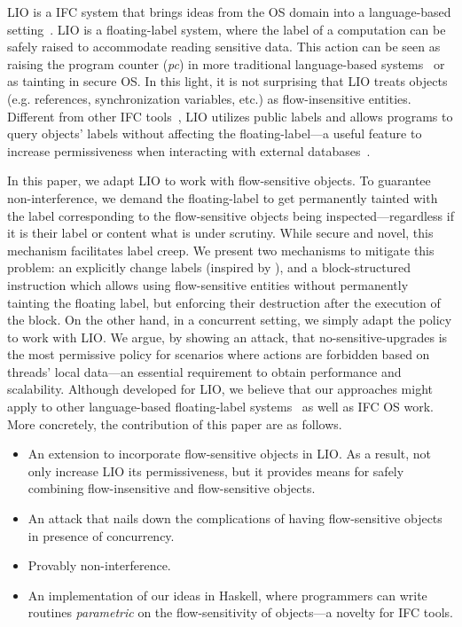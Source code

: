 LIO is a IFC system that brings ideas from the OS domain into a language-based
setting~\citep{stefan:lio,stefan:addressing-covert}.  LIO is a floating-label
system, where the label of a computation can be safely raised to accommodate
reading sensitive data. This action can be seen as raising the program counter
(\emph{pc}) in more traditional language-based
systems~\citep{sabelfeld:language-based-iflow} or as tainting in secure OS.  In
this light, it is not surprising that LIO treats objects (e.g. references,
synchronization variables, etc.) as flow-insensitive entities. Different from
other IFC tools~\citep{jif,FlowCaml,Hedin13}, LIO utilizes public labels and
allows programs to query objects' labels without affecting the
floating-label---a useful feature to increase permissiveness when interacting
with external databases~\citep{giffin:hails}.

In this paper, we adapt LIO to work with flow-sensitive objects. To guarantee
non-interference, we demand the floating-label to get permanently tainted with
the label corresponding to the flow-sensitive objects being
inspected---regardless if it is their label or content what is under
scrutiny. While secure and novel, this mechanism facilitates label creep. We
present two mechanisms to mitigate this problem: an explicitly change labels
(inspired by \citep{Hedin13}), and a block-structured instruction which allows
using flow-sensitive entities without permanently tainting the floating label,
but enforcing their destruction after the execution of the block.  On the other
hand, in a concurrent setting, we simply adapt the {\nsu} policy to work with
LIO. We argue, by showing an attack, that no-sensitive-upgrades is the most
permissive policy for scenarios where actions are forbidden based on threads'
local data---an essential requirement to obtain performance and
scalability. Although developed for LIO, we believe that our approaches might
apply to other language-based floating-label
systems~\citep[e.g.][]{10.1109/SP.2013.10} as well as IFC OS work.  More
concretely, the contribution of this paper are as follows.
\begin{itemize}

\item An extension to incorporate flow-sensitive objects in LIO. As a result,
  not only increase LIO its permissiveness, but it provides means for safely
  combining flow-insensitive and flow-sensitive objects.


\item An attack that nails down the complications of having flow-sensitive
  objects in presence of concurrency.

\item Provably non-interference. 

\item An implementation of our ideas in Haskell, where programmers can write
  routines \emph{parametric} on the flow-sensitivity of objects---a novelty for IFC
  tools. 
\end{itemize}

